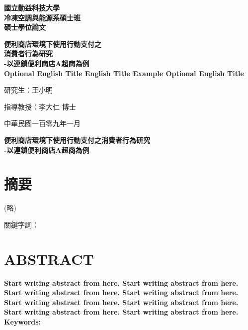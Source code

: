 \documentclass[12pt]{ncut}
\begin{document}
\renewcommand{\thesection}{}
\begin{titlepage}
  \renewcommand{\baselinestretch}{1.2}
    \begin{center}
        \Huge
        \textbf{國立勤益科技大學\\
        \vspace{1mm}
        冷凍空調與能源系碩士班\\
        \vspace{1mm}
        碩士學位論文}

        \vspace{2cm}
        \Huge
        \bfseries
        便利商店環境下使用行動支付之\\
        消費者行為研究\\
        -以連鎖便利商店A超商為例\\
        {\LARGE Optional English Title English Title Example
        Optional English Title}

        \vspace{1.5cm}

        \LARGE
        研究生：王小明
        \vspace{1.5cm}

        指導教授：李大仁 博士

        \vfill

        中華民國一百零九年一月

    \end{center}
    \newpage
\end{titlepage}

\begin{center} %
    \Large
    \textbf{便利商店環境下使用行動支付之消費者行為研究\\
    -以連鎖便利商店A超商為例}
\end{center}

\section{摘要}
\begin{center}
    (略)
\end{center}
\noindent 關鍵字詞：

\newpage

\section{ABSTRACT}

\textbf{Start writing abstract from here. Start writing abstract from here. Start writing abstract from here. Start writing abstract from here. Start writing abstract from here. Start writing abstract from here. Start writing abstract from here. Start writing abstract from here.\\
Keywords:}
\end{document}
